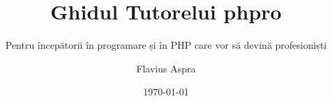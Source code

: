 \documentclass[a4paper,12pt,fleqn,twoside,openright,style=phpro]{yapbook}
\title{Ghidul Tutorelui phpro}
\subtitle{Pentru începătorii în programare și în PHP care vor să devină profesioniști}
\author{Flavius Aspra}
\date{\today}
\begin{document}
\frontmatter

    \maketitle

    \makecopyright

    \tableofcontents

    

\mainmatter

    
    
    

\appendix

\backmatter
\end{document}
